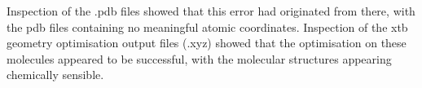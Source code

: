 \documentclass[11pt]{article} %
\begin{document}
Inspection of the .pdb files showed that this error had originated from there, with the pdb files containing no meaningful atomic coordinates. Inspection of the xtb geometry optimisation output files (.xyz) showed that the optimisation on these molecules appeared to be successful, with the molecular structures appearing chemically sensible. 
\end{document}
